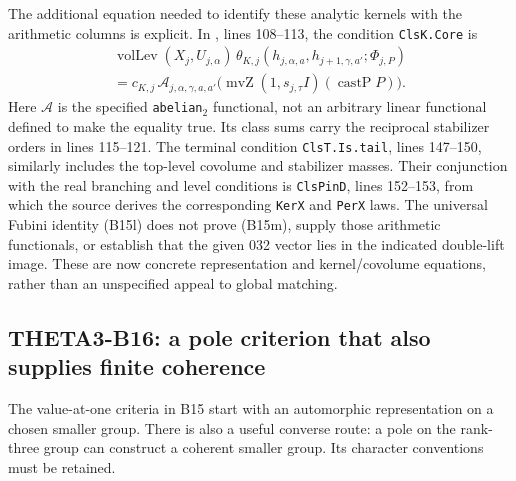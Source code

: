 \documentclass[11pt]{article}
\theoremstyle{definition}\newtheorem{definition}[theorem]{Definition}\newtheorem{remark}[theorem]{Remark}
\begin{document}
The additional equation needed to identify these analytic kernels with the arithmetic columns is explicit. In , lines 108--113, the condition \texttt{ClsK.Core} is
\begin{equation}
\begin{gathered}
 \operatorname{volLev}(X_j,U_{j,\alpha})\,
 \theta_{K,j}(h_{j,\alpha,a},h_{j+1,\gamma,a'};\Phi_{j,P})
 \\
 =c_{K,j}\,\mathcal A_{j,\alpha,\gamma,a,a'}
       \bigl(\operatorname{mvZ}(1,s_{j,\tau}I)(\operatorname{castP}P)\bigr).
\end{gathered}
 \tag{B15m}
\end{equation}
Here $\mathcal A$ is the specified \texttt{abelian\ensuremath{_2}} functional, not an arbitrary linear functional defined to make the equality true. Its class sums carry the reciprocal stabilizer orders in lines 115--121. The terminal condition \texttt{ClsT.Is.tail}, lines 147--150, similarly includes the top-level covolume and stabilizer masses. Their conjunction with the real branching and level conditions is \texttt{ClsPinD}, lines 152--153, from which the source derives the corresponding \texttt{KerX} and \texttt{PerX} laws. The universal Fubini identity (B15l) does not prove (B15m), supply those arithmetic functionals, or establish that the given 032 vector lies in the indicated double-lift image. These are now concrete representation and kernel/covolume equations, rather than an unspecified appeal to global matching.


\subsection{THETA3-B16: a pole criterion that also supplies finite coherence}\label{B16}

The value-at-one criteria in B15 start with an automorphic representation on a chosen smaller group. There is also a useful converse route: a pole on the rank-three group can construct a coherent smaller group. Its character conventions must be retained.
\end{document}
